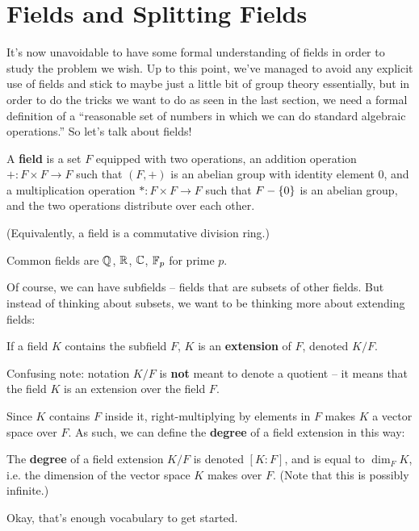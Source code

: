 \documentclass[12pt]{scrartcl}
\begin{document}
\section{Fields and Splitting Fields}
It's now unavoidable to have some formal understanding of fields in order to study the problem we wish. Up to this point, we've managed to avoid any explicit use of fields and stick to maybe just a little bit of group theory essentially, but in order to do the tricks we want to do as seen in the last section, we need a formal definition of a ``reasonable set of numbers in which we can do standard algebraic operations.'' So let's talk about fields! 

\begin{definition}
    A \textbf{field} is a set $F$ equipped with two operations, an addition operation $+ : F \times F \to F$ such that $(F, +)$ is an abelian group with identity element 0, and a multiplication operation $* : F \times F \to F$ such that $F - \left\{ 0 \right\}$ is an abelian group, and the two operations distribute over each other. 

    (Equivalently, a field is a commutative division ring.)
\end{definition}
\begin{example}
 Common fields are $\mathbb Q$, $\mathbb R$, $\mathbb C$, $\mathbb F_p$ for prime $p$.  
\end{example}
Of course, we can have subfields -- fields that are subsets of other fields. But instead of thinking about subsets, we want to be thinking more about extending fields:
\begin{definition}
    If a field $K$ contains the subfield $F$, $K$ is an \textbf{extension} of $F$, denoted $K/F$. 
\end{definition}
\begin{remark}
    Confusing note: notation $K/F$ is \textbf{not} meant to denote a quotient -- it means that the field $K$ is an extension over the field $F$. 
\end{remark}
Since $K$ contains $F$ inside it, right-multiplying by elements in $F$ makes $K$ a vector space over $F$. As such, we can define the \textbf{degree} of a field extension in this way: 
\begin{definition}
    The \textbf{degree} of a field extension $K/F$ is denoted $[K : F]$, and is equal to $\dim_F K$, i.e. the dimension of the vector space $K$ makes over $F$. (Note that this is possibly infinite.)
\end{definition}
Okay, that's enough vocabulary to get started. 
\end{document}
